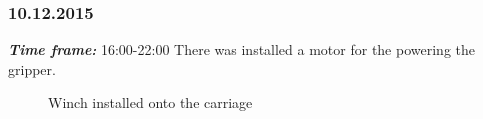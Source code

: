 \subsubsection{10.12.2015}
\textit{\textbf{Time frame:}} 16:00-22:00 \newline
There was installed a motor for the powering the gripper.

\begin{figure}[H]
	\begin{minipage}[h]{0.58\linewidth}
		\caption{Winch installed onto the carriage}

\end{minipage}
\end{figure}
